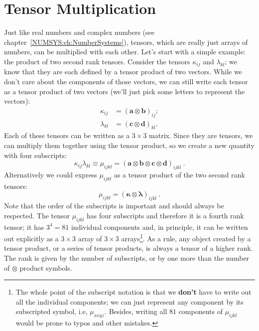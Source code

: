 \section{Tensor Multiplication}\label{\chabbr:sec:tensorproducts}
Just like real numbers and complex numbers (see chapter~\ref{NUMSYS:ch:NumberSystems}), tensors, which are really just arrays of numbers, can be multiplied with each other.  Let's start with a simple example: the product of two second rank tensors. Consider the tensors $\kappa_{ij}$ and $\lambda_{kl}$; we know that they are each defined by a tensor product of two vectors.  While we don't care about the components of those vectors, we can still write each tensor as a tensor product of two vectors (we'll just pick some letters to represent the vectors):
\begin{equation}
	\begin{split}
		\kappa_{ij} & = (\mathbf{a}\otimes\mathbf{b})_{ij};\\
		\lambda_{kl} & = (\mathbf{c}\otimes\mathbf{d})_{kl}.
	\end{split}
\end{equation}
Each of these tensors can be written as a $3\times 3$ matrix.  Since they are tensors, we can multiply them together using the tensor product, so we create a new quantity with four subscripts:
\begin{equation}
	\kappa_{ij}\lambda_{kl} \equiv \mu_{ijkl} =  (\mathbf{a}\otimes\mathbf{b}\otimes\mathbf{c}\otimes\mathbf{d})_{ijkl}\ .
\end{equation}
Alternatively we could express $\mu_{ijkl}$ as a tensor product of the two second rank tensors:
\begin{equation}
	\mu_{ijkl} =  (\bm{\kappa}\otimes\bm{\lambda})_{ijkl}\ .
\end{equation}
Note that the order of the subscripts is important and should always be respected. The tensor $\mu_{ijkl}$ has four subscripts and therefore it is a fourth rank tensor; it has $3^4=81$ individual components and, in principle, it can be written out explicitly as a $3\times 3$ array of $3\times 3$ arrays\footnote{The whole point of the subscript notation is that we \textbf{don't} have to write out all the individual components; we can just represent any component by its subscripted symbol, i.e, $\mu_{xxyz}$. Besides, writing all $81$ components of $\mu_{ijkl}$ would be prone to typos and other mistakes.}.  As a rule, any object created by a tensor product, or a series of tensor products, is always a tensor of a higher rank.  The rank is given by the number of subscripts, or by one more than the number of $\otimes$ product symbols.

